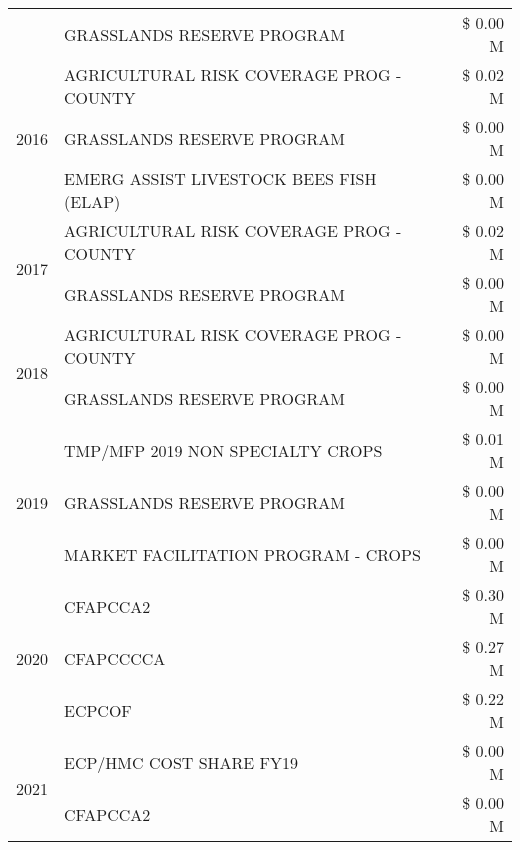 \begin{tabular}{llr}
 & GRASSLANDS RESERVE PROGRAM & \$ 0.00 M \\
\cline{1-3}
\multirow[t]{3}{*}{2016} & AGRICULTURAL RISK COVERAGE PROG - COUNTY & \$ 0.02 M \\
 & GRASSLANDS RESERVE PROGRAM & \$ 0.00 M \\
 & EMERG ASSIST LIVESTOCK BEES FISH (ELAP) & \$ 0.00 M \\
\cline{1-3}
\multirow[t]{2}{*}{2017} & AGRICULTURAL RISK COVERAGE PROG - COUNTY & \$ 0.02 M \\
 & GRASSLANDS RESERVE PROGRAM & \$ 0.00 M \\
\cline{1-3}
\multirow[t]{2}{*}{2018} & AGRICULTURAL RISK COVERAGE PROG - COUNTY & \$ 0.00 M \\
 & GRASSLANDS RESERVE PROGRAM & \$ 0.00 M \\
\cline{1-3}
\multirow[t]{3}{*}{2019} & TMP/MFP 2019 NON SPECIALTY CROPS & \$ 0.01 M \\
 & GRASSLANDS RESERVE PROGRAM & \$ 0.00 M \\
 & MARKET FACILITATION PROGRAM - CROPS & \$ 0.00 M \\
\cline{1-3}
\multirow[t]{3}{*}{2020} & CFAPCCA2 & \$ 0.30 M \\
 & CFAPCCCCA & \$ 0.27 M \\
 & ECPCOF & \$ 0.22 M \\
\cline{1-3}
\multirow[t]{2}{*}{2021} & ECP/HMC COST SHARE FY19 & \$ 0.00 M \\
 & CFAPCCA2 & \$ 0.00 M \\
\cline{1-3}
\bottomrule
\end{tabular}
